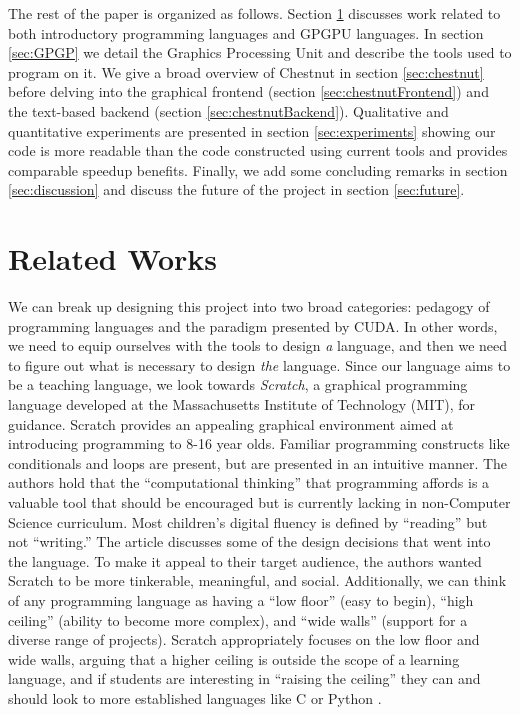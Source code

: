 \documentclass[twocolumn]{article}
\renewcommand{\|}{\origbar} %
\begin{document}
The rest of the paper is organized as follows. Section \ref{sec:relatedWorks} discusses work related to both introductory programming languages and GPGPU languages. In section \ref{sec:GPGP} we detail the Graphics Processing Unit and describe the tools used to program on it. We give a broad overview of Chestnut in section \ref{sec:chestnut} before delving into the graphical frontend (section \ref{sec:chestnutFrontend}) and the text-based backend (section \ref{sec:chestnutBackend}). Qualitative and quantitative experiments are presented in section \ref{sec:experiments} showing our code is more readable than the code constructed using current tools and provides comparable speedup benefits. Finally, we add some concluding remarks in section \ref{sec:discussion} and discuss the future of the project in section \ref{sec:future}.

\section{Related Works}
\label{sec:relatedWorks}


We can break up designing this project into two broad categories: pedagogy of programming languages and the paradigm presented by CUDA. In other words, we need to equip ourselves with the tools to design {\em a} language, and then we need to figure out what is necessary to design {\em the} language. Since our language aims to be a teaching language, we look towards {\em Scratch}, a graphical programming language developed at the Massachusetts Institute of Technology (MIT), for guidance. Scratch provides an appealing graphical environment aimed at introducing programming to 8-16 year olds. Familiar programming constructs like conditionals and loops are present, but are presented in an intuitive manner. The authors hold that the ``computational thinking'' that programming affords is a valuable tool that should be encouraged but is currently lacking in non-Computer Science curriculum. Most children's digital fluency is defined by ``reading'' but not ``writing.'' The article discusses some of the design decisions that went into the language. To make it appeal to their target audience, the authors wanted Scratch to be more tinkerable, meaningful, and social. Additionally, we can think of any programming language as having a ``low floor'' (easy to begin), ``high ceiling'' (ability to become more complex), and ``wide walls'' (support for a diverse range of projects). Scratch appropriately focuses on the low floor and wide walls, arguing that a higher ceiling is outside the scope of a learning language, and if students are interesting in ``raising the ceiling'' they can and should look to more established languages like C or Python \cite{resnick}.
\end{document}
